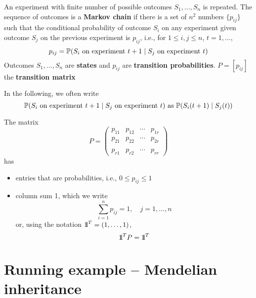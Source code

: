 \documentclass[aspectratio=169]{beamer}\usepackage[]{graphicx}\usepackage[]{xcolor}
\begin{document}
\begin{frame}
\begin{definition}
An experiment with finite number of possible outcomes $S_1,\ldots,S_n$ is repeated. The sequence of outcomes is a \textbf{Markov chain} if there is a set of $n^2$ numbers $\{p_{ij}\}$ such that the conditional probability of outcome $S_i$ on any experiment given outcome $S_j$ on the previous experiment is $p_{ij}$, i.e., for $1\leq i,j\leq n$, $t=1,\ldots$,
\[
	p_{ij}=\mathbb{P}(S_i\textrm{ on experiment }t+1\;|\;
	S_j\textrm{ on experiment }t)	
\]
Outcomes $S_1,\ldots,S_n$ are \textbf{states} and $p_{ij}$ are \textbf{transition probabilities}. $P=[p_{ij}]$ the \textbf{transition matrix}
\end{definition}
\vfill
In the following, we often write
\[
\mathbb{P}(S_i\textrm{ on experiment }t+1\;|\;
	S_j\textrm{ on experiment }t)	\text{ as }\mathbb{P}(S_i(t+1)\;|\;S_j(t))
\]
\end{frame}


\begin{frame} 
The matrix 
\[
P=
\begin{pmatrix}
p_{11} & p_{12} & \cdots & p_{1r} \\
p_{21} & p_{22} & \cdots & p_{2r} \\
&&& \\
p_{r1} & p_{r2} & \cdots & p_{rr}
\end{pmatrix}
\]
has
\begin{itemize}
\item entries that are probabilities, i.e., $0\leq p_{ij}\leq 1$
\item column sum 1, which we write
\[
\sum_{i=1}^n p_{ij}=1,\quad j=1,\ldots,n
\]
or, using the notation $\nbOne^T=(1,\ldots,1)$,
\[
\nbOne^TP=\nbOne^T
\]
\end{itemize}
\end{frame}


\section{Running example -- Mendelian inheritance}
\end{document}
